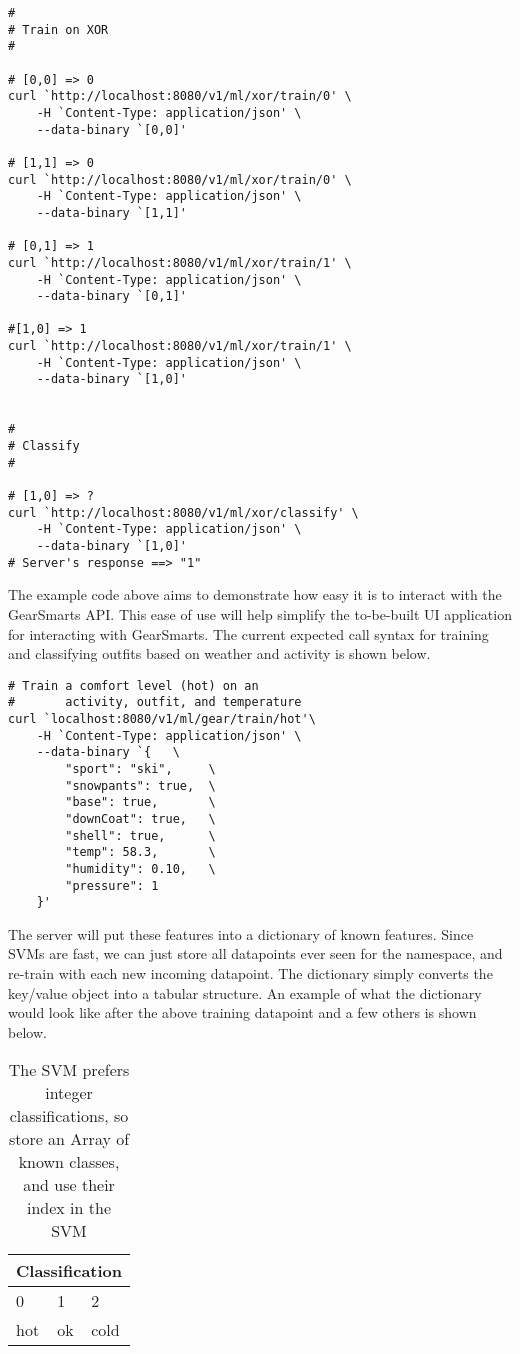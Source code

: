 \begin{lstlisting}
#
# Train on XOR
#

# [0,0] => 0
curl `http://localhost:8080/v1/ml/xor/train/0' \
    -H `Content-Type: application/json' \
    --data-binary `[0,0]'

# [1,1] => 0
curl `http://localhost:8080/v1/ml/xor/train/0' \
    -H `Content-Type: application/json' \
    --data-binary `[1,1]'

# [0,1] => 1
curl `http://localhost:8080/v1/ml/xor/train/1' \
    -H `Content-Type: application/json' \
    --data-binary `[0,1]'

#[1,0] => 1
curl `http://localhost:8080/v1/ml/xor/train/1' \
    -H `Content-Type: application/json' \
    --data-binary `[1,0]'


#
# Classify
#

# [1,0] => ?
curl `http://localhost:8080/v1/ml/xor/classify' \
    -H `Content-Type: application/json' \
    --data-binary `[1,0]'
# Server's response ==> "1"
\end{lstlisting}

The example code above aims to demonstrate how easy it is to interact with the GearSmarts API. This ease of use will
help simplify the to-be-built UI application for interacting with GearSmarts. The current expected call syntax for
training and classifying outfits based on weather and activity is shown below.

\begin{lstlisting}
# Train a comfort level (hot) on an
#       activity, outfit, and temperature
curl `localhost:8080/v1/ml/gear/train/hot'\
    -H `Content-Type: application/json' \
    --data-binary `{   \
        "sport": "ski",     \
        "snowpants": true,  \
        "base": true,       \
        "downCoat": true,   \
        "shell": true,      \
        "temp": 58.3,       \
        "humidity": 0.10,   \
        "pressure": 1
    }'
\end{lstlisting}

The server will put these features into a dictionary of known features. Since SVMs are fast, we can just store all
datapoints ever seen for the namespace, and re-train with each new incoming datapoint. The dictionary simply converts
the key/value object into a tabular structure. An example of what the dictionary would look like after the above
training datapoint and a few others is shown below.

\begin{table}
\label{table:classifications}
    \begin{tabular}{lll}
        \hline
        \multicolumn{3}{c}{Classification} \\
        \hline
        0 & 1 & 2 \\
        hot & ok & cold \\
        \hline
    \end{tabular}
    \caption{The SVM prefers integer classifications, so store an Array of known classes, and use their index in the SVM}
\end{table}


